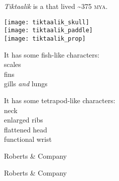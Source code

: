 \documentclass[t]{beamer}
\begin{document}
\begin{frame}[t]{\textit{Tiktaalik} is a  that lived \textasciitilde375 \textsc{mya}.}
	
	\vspace*{-\baselineskip}
	
	\begin{multicols}{2}
	
	\begin{center}
	\texttt{[image: tiktaalik\_skull]} \\ \vspace*{1ex}
	\texttt{[image: tiktaalik\_paddle]}\\
	\texttt{[image: tiktaalik\_prop]}
	\end{center}

	\columnbreak
	
	It has some fish-like characters:\\
	\hspace*{1em} scales\\	
	\hspace*{1em} fins\\
	\hspace*{1em} gills \emph{and} lungs

	\vspace*{\baselineskip}
	
	It has some tetrapod-like characters:\\
	\hspace*{1em} neck	\\
	\hspace*{1em} enlarged ribs\\
	\hspace*{1em} flattened head\\
	\hspace*{1em} functional wrist
	
	\end{multicols}

\end{frame}
%
{
\begin{frame}[b]
\hfill \tiny \textcopyright Roberts \& Company
\end{frame}
}
%
{
\begin{frame}[b]
\hfill \tiny \textcopyright Roberts \& Company
\end{frame}
}
%
\end{document}

